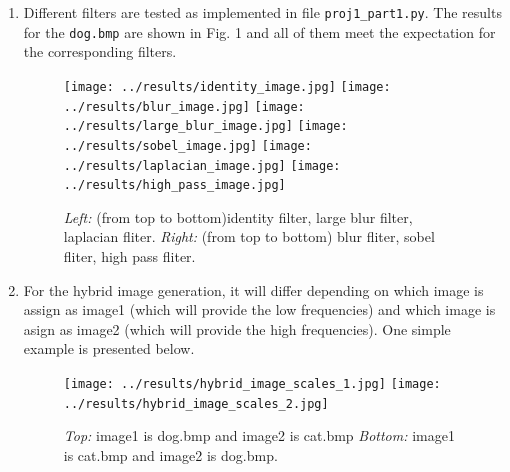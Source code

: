 \begin{enumerate}
    \item Different filters are tested as implemented in file \verb|proj1_part1.py|. The results for the \verb|dog.bmp| are shown in Fig. 1 and all of them meet the expectation for the corresponding filters.
    
    \begin{figure}[h]
        \centering
        \texttt{[image: ../results/identity\_image.jpg]}
        \texttt{[image: ../results/blur\_image.jpg]}
        \texttt{[image: ../results/large\_blur\_image.jpg]}
        \texttt{[image: ../results/sobel\_image.jpg]}
        \texttt{[image: ../results/laplacian\_image.jpg]}
        \texttt{[image: ../results/high\_pass\_image.jpg]}
        \caption{\emph{Left:} (from top to bottom)identity filter, large blur filter, laplacian fliter. \emph{Right:} (from top to bottom) blur fliter, sobel fliter, high pass fliter.}
    \end{figure}

    \item For the hybrid image generation, it will differ depending on which image is assign as image1 (which will provide the low frequencies) and which image
    is asign as image2 (which will provide the high frequencies). One simple example is presented below.
    \begin{figure}[h]
        \centering
        \texttt{[image: ../results/hybrid\_image\_scales\_1.jpg]}
        \texttt{[image: ../results/hybrid\_image\_scales\_2.jpg]}
        \caption{\emph{Top:} image1 is dog.bmp and image2 is cat.bmp \emph{Bottom:} image1 is cat.bmp and image2 is dog.bmp.}
    \end{figure}

\end{enumerate}

\newpage
